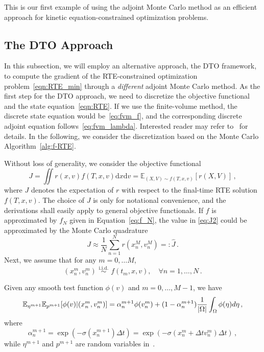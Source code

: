\documentclass[12pt]{amsart}
\newcommand{\rd}{\mathrm{d}}
\begin{document}
This is our first example of using the adjoint Monte Carlo method as an efficient approach for kinetic equation-constrained optimization problems.



\subsection{The DTO Approach}\label{subsec:RTE_DTO}
In this subsection, we will employ an alternative approach, the DTO framework, to compute the gradient of the RTE-constrained optimization problem~\eqref{eqn:RTE_min} through a \textit{different} adjoint Monte Carlo method. As the first step for the DTO approach, we need to discretize the objective functional and the state equation~\eqref{eqn:RTE}. If we use the finite-volume method, the discrete state equation would be~\eqref{eq:fvm_f}, and the corresponding discrete adjoint equation follows~\eqref{eq:fvm_lambda}. Interested reader may refer to~\cite[Appendix A]{li2022monte} for details. In the following, we consider the discretization based on the Monte Carlo Algorithm~\ref{alg:f-RTE}.

Without loss of generality, we consider the objective functional
\begin{equation}\label{eq:J2}
    J = \iint r(x,v) f(T,x,v) \rd x \rd v  = \mathbb{E}_{(X,V)\sim  f(T,x,v) } \left[r(X,V)\right]\,,
\end{equation}
where $J$ denotes the expectation of $r$ with respect to the  final-time RTE solution $f(T,x,v)$. The choice of $J$ is only for notational convenience, and the derivations shall easily apply to general objective functionals. If $f$ is approximated by $f_N$ given in Equation~\eqref{eq:f_N}, the value in \eqref{eq:J2} could be approximated by the Monte Carlo quadrature
\begin{equation}\label{eq:J2_MC}
J \approx \frac{1}{N} \sum_{n=1}^N r\left(x_n^M, v_n^M \right) =: \hat{J}  \,.
\end{equation}
Next, we assume that for any $m= 0,\ldots M$, 
$$
(x_n^m, v_n^m) \,\, \overset{\text{i.i.d.}} {\sim} \,\, f(t_m,x,v),\quad \forall n=1,\ldots,N\,.
$$
 
Given any smooth test function $\phi(v)$ and $m = 0,\ldots, M-1$, we have
\begin{equation} \label{eq:probab}
    \mathbb E_{\eta^{m+1}} \mathbb E_{p^{m+1}} [\phi(v) | (x_n^m,v_n^m) ] = \alpha_n^{m+1}  \phi(v_n^m) + (1-\alpha_n^{m+1} ) \frac{1}{|\Omega|}\int_\Omega \phi(\eta)d\eta\,,
\end{equation}
where 
$$
\alpha_n^{m+1} = \exp(-\sigma(x_n^{m+1}) \Delta t) = \exp(-\sigma(x_n^{m} + \Delta t v_n^m) \Delta t)\,, 
$$ 
while $\eta^{m+1}$ and $p^{m+1}$ are random variables in~.  
\end{document}
